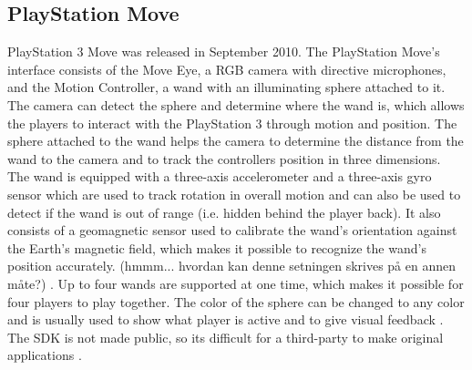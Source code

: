 \subsection{PlayStation Move}
PlayStation 3 Move was released in September 2010. The PlayStation Move’s interface consists of the Move Eye, a RGB camera with directive microphones, and the Motion Controller, a wand with an illuminating sphere attached to it. The camera can detect the sphere and determine where the wand is, which allows the players to interact with the PlayStation 3 through motion and position. The sphere attached to the wand helps the camera to determine the distance from the wand to the camera and to track the controllers position in three dimensions. The wand is equipped with a three-axis accelerometer and a three-axis gyro sensor which are used to track rotation in overall motion and can also be used to detect if the wand is out of range (i.e. hidden behind the player back). It also consists of a geomagnetic sensor used to calibrate the wand’s orientation against the Earth’s magnetic field, which makes it possible to recognize the wand’s position accurately.  (hmmm... hvordan kan denne setningen skrives på en annen måte?) \cite{comparison}. Up to four wands are supported at one time, which makes it possible for four players to play together. The color of the sphere can be changed to any color and is usually used to show what player is active and to give visual feedback \cite{ppmove}. The SDK is not made public, so its difficult for a third-party to make original applications \cite{comparison}. 

